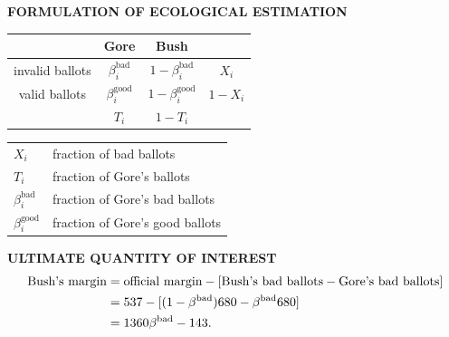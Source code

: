 \documentclass[landscape,letterpaper]{seminar}
\newcommand{\bb}{\beta^{\text{bad}}}
\newcommand{\bg}{\beta^{\text{good}}}
\renewcommand{\sc}{\scriptsize}
\begin{document}
\begin{slide}

{\bf F{\sc ORMULATION} O{\sc F} E{\sc COLOGICAL} E{\sc STIMATION}}

\begin{minipage}[c]{2.75in}
\bigskip
\small
\begin{center}
\begin{tabular}{cccc}
                & Gore  & Bush &         \\
\hline 
invalid ballots & $\bb_i$  & $1-\bb_i$ & $X_i$   \\
valid ballots   & $\bg_i$  & $1-\bg_i$ & $1-X_i$ \\
\hline
                & $T_i$ & $1-T_i$ &         \\
\end{tabular} 
\end{center}
\end{minipage}
\begin{minipage}[c]{2in}
\small
\vspace{0.2in}
\begin{tabular}{l @{= } l}
$X_i$ & fraction of bad ballots \\
$T_i$ &  fraction of Gore's ballots \\
$\bb_i$ & fraction of Gore's bad ballots \\ 
$\bg_i$ & fraction of Gore's good ballots \\ 
\end{tabular}
\end{minipage}

\bigskip
\normalsize
{\bf U{\sc LTIMATE} Q{\sc UANTITY} O{\sc F} I{\sc NTEREST}} 
\begin{align*}
  \text{Bush's margin} & = \text{official margin}
  - [\text{Bush's bad ballots} - \text{Gore's bad ballots}] \notag\\
  & = 537 - [(1-\bb)680-\bb 680]\\
  & = 1360 \bb - 143. \label{qoi}
\end{align*}

\end{slide}

\end{document}
